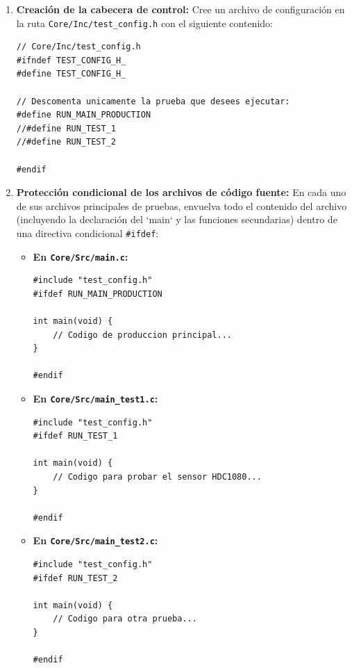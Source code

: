 \documentclass[
10pt, %
a4paper, %
oneside, %
headinclude,footinclude, %
BCOR5mm, %
]{scrartcl}
\begin{document}
\begin{enumerate}
	\item \textbf{Creación de la cabecera de control:}
	Cree un archivo de configuración en la ruta \texttt{Core/Inc/test\_config.h} con el siguiente contenido:
	\begin{lstlisting}[style=CMakeStyle, caption={Archivo de configuración de pruebas test\_config.h.}]
// Core/Inc/test_config.h
#ifndef TEST_CONFIG_H_
#define TEST_CONFIG_H_

// Descomenta unicamente la prueba que desees ejecutar:
#define RUN_MAIN_PRODUCTION
//#define RUN_TEST_1
//#define RUN_TEST_2

#endif
	\end{lstlisting}
	
	\item \textbf{Protección condicional de los archivos de código fuente:}
	En cada uno de sus archivos principales de pruebas, envuelva todo el contenido del archivo (incluyendo la declaración del `main` y las funciones secundarias) dentro de una directiva condicional \texttt{\#ifdef}:
	
	\begin{itemize}
		\item \textbf{En \texttt{Core/Src/main.c}:}
		\begin{lstlisting}[style=CMakeStyle]
#include "test_config.h"
#ifdef RUN_MAIN_PRODUCTION

int main(void) {
    // Codigo de produccion principal...
}

#endif
		\end{lstlisting}
		
		\item \textbf{En \texttt{Core/Src/main\_test1.c}:}
		\begin{lstlisting}[style=CMakeStyle]
#include "test_config.h"
#ifdef RUN_TEST_1

int main(void) {
    // Codigo para probar el sensor HDC1080...
}

#endif
		\end{lstlisting}
		
		\item \textbf{En \texttt{Core/Src/main\_test2.c}:}
		\begin{lstlisting}[style=CMakeStyle]
#include "test_config.h"
#ifdef RUN_TEST_2

int main(void) {
    // Codigo para otra prueba...
}

#endif
		\end{lstlisting}
	\end{itemize}
\end{enumerate}
\end{document}
